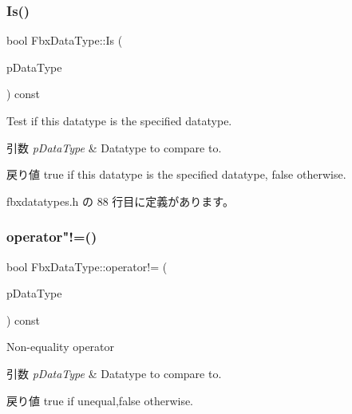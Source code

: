 \subsubsection{\texorpdfstring{Is()}{Is()}}
{\footnotesize\ttfamily bool Fbx\+Data\+Type\+::\+Is (\begin{DoxyParamCaption}\item[{const \hyperlink{class_fbx_data_type}{Fbx\+Data\+Type} \&}]{p\+Data\+Type }\end{DoxyParamCaption}) const\hspace{0.3cm}{\ttfamily [inline]}}

Test if this datatype is the specified datatype. 
\begin{DoxyParams}{引数}
{\em p\+Data\+Type} & Datatype to compare to. \\
\hline
\end{DoxyParams}
\begin{DoxyReturn}{戻り値}
{\ttfamily true} if this datatype is the specified datatype, {\ttfamily false} otherwise. 
\end{DoxyReturn}


 fbxdatatypes.\+h の 88 行目に定義があります。

\mbox{\label{class_fbx_data_type_a219d626fd80822f8d1f45b59b4dd1837}} 
\subsubsection{\texorpdfstring{operator"!=()}{operator!=()}}
{\footnotesize\ttfamily bool Fbx\+Data\+Type\+::operator!= (\begin{DoxyParamCaption}\item[{const \hyperlink{class_fbx_data_type}{Fbx\+Data\+Type} \&}]{p\+Data\+Type }\end{DoxyParamCaption}) const\hspace{0.3cm}{\ttfamily [inline]}}

Non-\/equality operator 
\begin{DoxyParams}{引数}
{\em p\+Data\+Type} & Datatype to compare to. \\
\hline
\end{DoxyParams}
\begin{DoxyReturn}{戻り値}
{\ttfamily true} if unequal,{\ttfamily false} otherwise. 
\end{DoxyReturn}


